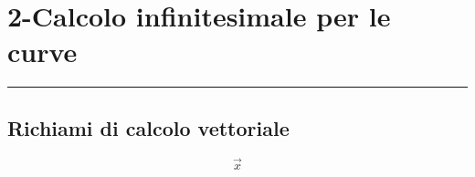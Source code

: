 \section*{2-Calcolo infinitesimale per le curve}
\rule{\textwidth}{2pt}
\subsection*{Richiami di calcolo vettoriale}
\[
    \vec{x}
\]